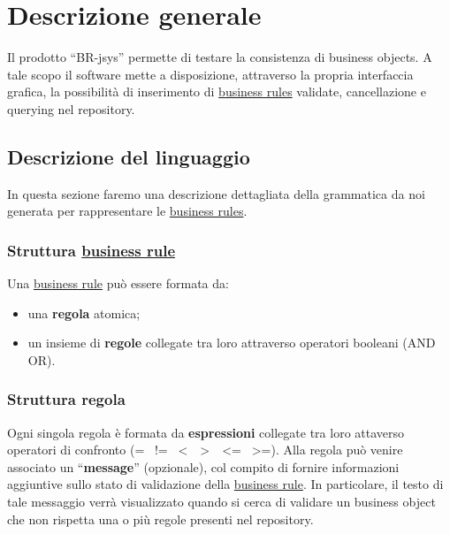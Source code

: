 \chapter{Descrizione generale}
Il prodotto ``BR-jsys'' permette di testare la consistenza di business objects. A tale scopo il software mette a disposizione, attraverso la propria interfaccia grafica, la possibilit\`a di inserimento di \underline{business rules} validate, cancellazione e querying nel repository.
\section{Descrizione del linguaggio}
In questa sezione faremo una descrizione dettagliata della grammatica da noi generata per rappresentare le \underline{business rules}. 
\subsection{Struttura \underline{business rule}}
Una \underline{business rule} pu\`o essere formata da:
\begin{itemize}
\item una \textbf{regola} atomica;
\item un insieme di \textbf{regole} collegate tra loro attraverso operatori booleani (AND \textbar OR).
\end{itemize}
\subsection{Struttura regola}
Ogni singola regola \`e formata da \textbf{espressioni} collegate tra loro attaverso operatori di confronto (= \textbar\ != \textbar\ \textless\ \textbar\ \textgreater\ \textbar\ \textless= \textbar\ \textgreater=). Alla regola pu\`o venire associato un ``\textbf{message}'' (opzionale), col compito di fornire informazioni aggiuntive sullo stato di validazione della \underline{business rule}. In particolare, il testo di tale messaggio verr\`a visualizzato quando si cerca di validare un business object che non rispetta una o pi\`u regole presenti nel repository.
